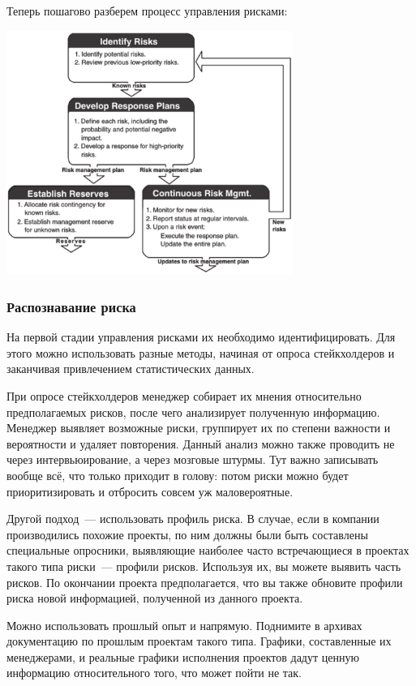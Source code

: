 \documentclass{../../text-style}
\begin{document}
Теперь пошагово разберем процесс управления рисками:

\begin{center}
    \includegraphics[width=0.7\textwidth]{riskManagementLoop.png}
\end{center}

\subsubsection{Распознавание риска}

На первой стадии управления рисками их необходимо идентифицировать. Для этого можно использовать разные методы, начиная от опроса стейкхолдеров и заканчивая привлечением статистических данных.

При опросе стейкхолдеров менеджер собирает их мнения относительно предполагаемых рисков, после чего анализирует полученную информацию. Менеджер выявляет возможные риски, группирует их по степени важности и вероятности и удаляет повторения. Данный анализ можно также проводить не через интервьюирование, а через мозговые штурмы. Тут важно записывать вообще всё, что только приходит в голову: потом риски можно будет приоритизировать и отбросить совсем уж маловероятные.

Другой подход~--- использовать профиль риска. В случае, если в компании производились похожие проекты, по ним должны были быть составлены специальные опросники, выявляющие наиболее часто встречающиеся в проектах такого типа риски~--- профили рисков. Используя их, вы можете выявить часть рисков. По окончании проекта предполагается, что вы также обновите профили риска новой информацией, полученной из данного проекта.

Можно использовать прошлый опыт и напрямую. Поднимите в архивах документацию по прошлым проектам такого типа. Графики, составленные их менеджерами, и реальные графики исполнения проектов дадут ценную информацию относительного того, что может пойти не так.
\end{document}
